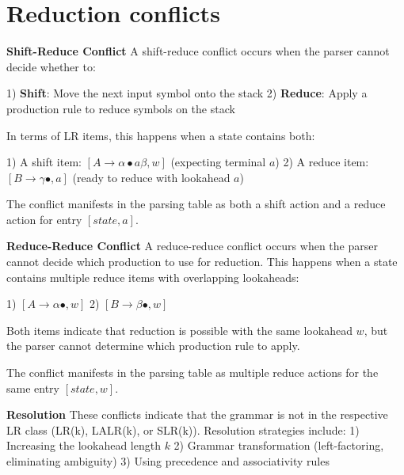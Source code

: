 \section{Reduction conflicts}

\textbf{Shift-Reduce Conflict}
A shift-reduce conflict occurs when the parser cannot decide whether to:

1) \textbf{Shift}: Move the next input symbol onto the stack
2) \textbf{Reduce}: Apply a production rule to reduce symbols on the stack


In terms of LR items, this happens when a state contains both:

1) A shift item: $[A \to \alpha \bullet a \beta, w]$ (expecting terminal $a$)
2) A reduce item: $[B \to \gamma \bullet, a]$ (ready to reduce with lookahead $a$)


The conflict manifests in the parsing table as both a shift action and a reduce action for entry $[state, a]$.

\textbf{Reduce-Reduce Conflict}
A reduce-reduce conflict occurs when the parser cannot decide which production to use for reduction. This happens when a state contains multiple reduce items with overlapping lookaheads:

1) $[A \to \alpha \bullet, w]$
2) $[B \to \beta \bullet, w]$


Both items indicate that reduction is possible with the same lookahead $w$, but the parser cannot determine which production rule to apply.

The conflict manifests in the parsing table as multiple reduce actions for the same entry $[state, w]$.

\textbf{Resolution}
These conflicts indicate that the grammar is not in the respective LR class (LR(k), LALR(k), or SLR(k)). Resolution strategies include:
1) Increasing the lookahead length $k$
2) Grammar transformation (left-factoring, eliminating ambiguity)
3) Using precedence and associativity rules
